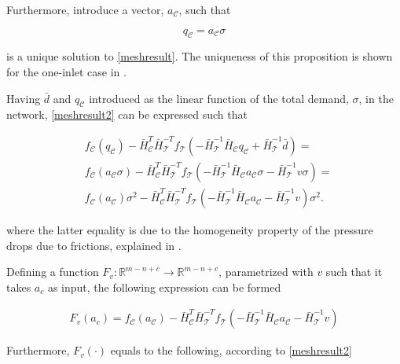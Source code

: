 Furthermore, introduce a vector, $a_{\mathcal{C}}$, such that 

\begin{equation}
\label{ac}
q_{\mathcal{C}} = a_{\mathcal{C}} \sigma
\end{equation}

is a unique solution to \eqref{meshresult}. The uniqueness of this proposition is shown for the one-inlet case in \cite{oneinput_paper}.

Having $\bar{d}$ and $q_{\mathcal{C}}$ introduced as the linear function of the total demand, $\sigma$, in the network, \eqref{meshresult2} can be expressed such that

\begin{equation}
\begin{split}
\label{meshresult3}
& f_{\mathcal{C}}(q_\mathcal{C}) -\bar{H}^T_{\mathcal{C}}\bar{H}^{-T}_{\mathcal{T}} f_{\mathcal{T}}(-\bar{H}^{-1}_{\mathcal{T}} \bar{H}_{\mathcal{C}} q_\mathcal{C} + \bar{H}^{-1}_{\mathcal{T}} \bar{d}) = \\
& f_{\mathcal{C}}(a_{\mathcal{C}} \sigma) -\bar{H}^T_{\mathcal{C}}\bar{H}^{-T}_{\mathcal{T}} f_{\mathcal{T}}(-\bar{H}^{-1}_{\mathcal{T}} \bar{H}_{\mathcal{C}} a_{\mathcal{C}} \sigma - \bar{H}^{-1}_{\mathcal{T}} v \sigma) = \\
& f_{\mathcal{C}}(a_{\mathcal{C}})\sigma^2 -\bar{H}^T_{\mathcal{C}}\bar{H}^{-T}_{\mathcal{T}} f_{\mathcal{T}}(-\bar{H}^{-1}_{\mathcal{T}} \bar{H}_{\mathcal{C}} a_{\mathcal{C}} - \bar{H}^{-1}_{\mathcal{T}} v) \sigma^2.
\end{split}
\end{equation} 

where the latter equality is due to the homogeneity property of the pressure drops due to frictions, explained in .

Defining a function $F_v : \mathbb{R}^{m-n+c} \rightarrow \mathbb{R}^{m-n+c}$, parametrized with $v$ such that it takes $a_c$ as input, the following expression can be formed

\begin{equation}
\begin{split}
\label{Fv}
F_v(a_c) = f_{\mathcal{C}}(a_{\mathcal{C}}) -\bar{H}^T_{\mathcal{C}}\bar{H}^{-T}_{\mathcal{T}} f_{\mathcal{T}}(-\bar{H}^{-1}_{\mathcal{T}} \bar{H}_{\mathcal{C}} a_{\mathcal{C}} - \bar{H}^{-1}_{\mathcal{T}} v) 
\end{split}
\end{equation}

Furthermore, $F_v(\cdot)$ equals to the following, according to \eqref{meshresult2}

